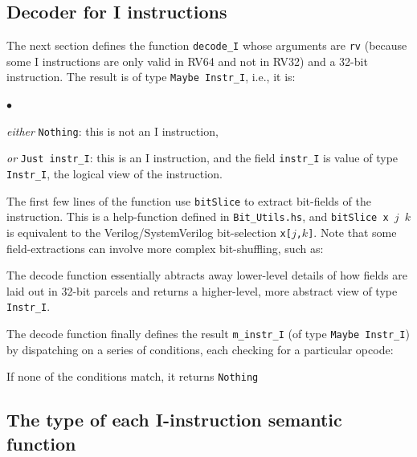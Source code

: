 \documentclass[11pt]{article}
\newenvironment{tightlist}%
{\begin{list}{$\bullet$}{%
    \setlength{\topsep}{0in}
    \setlength{\partopsep}{0in}
    \setlength{\itemsep}{0in}
    \setlength{\parsep}{0in}
    \setlength{\leftmargin}{1.5em}
    \setlength{\rightmargin}{0in}
    \setlength{\itemindent}{0in}
}
}%
{\end{list}
}
\begin{document}

\subsection{Decoder for I instructions}

The next section defines the function \verb|decode_I| whose arguments
are {\tt rv} (because some I instructions are only valid in RV64 and
not in RV32) and a 32-bit instruction.  The result is of type
\verb|Maybe Instr_I|, i.e., it is:

\begin{tightlist}

 \item \emph{either} \verb|Nothing|: this is not an I instruction,

 \item \emph{or} \verb|Just instr_I|: this is an I instruction, and
 the field \verb|instr_I| is value of type \verb|Instr_I|, the logical
 view of the instruction.

\end{tightlist}



The first few lines of the function use \verb|bitSlice| to extract
bit-fields of the instruction.  This is a help-function defined in
\verb|Bit_Utils.hs|, and {\tt bitSlice~x~$j$~$k$} is equivalent to the
Verilog/SystemVerilog bit-selection {\tt x[$j$,$k$]}.  Note that some
field-extractions can involve more complex bit-shuffling, such as:



The decode function essentially abtracts away lower-level details of
how fields are laid out in 32-bit parcels and returns a higher-level,
more abstract view of type \verb|Instr_I|.

The decode function finally defines the result \verb|m_instr_I| (of type
\verb|Maybe Instr_I|) by dispatching on a series of conditions, each
checking for a particular opcode:



If none of the conditions match, it returns \verb|Nothing|



\subsection{The type of each I-instruction semantic function}
\end{document}
